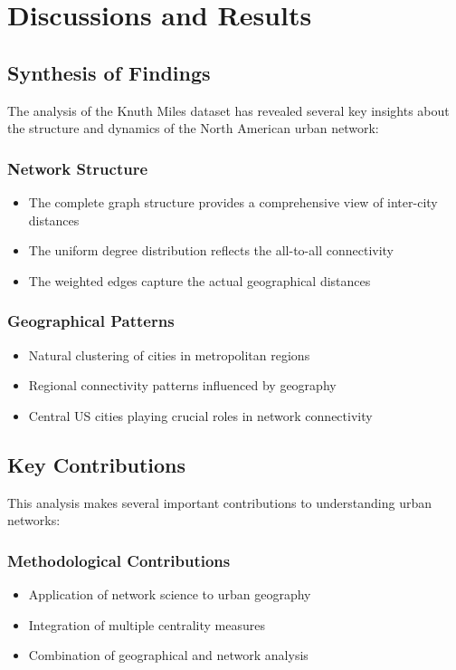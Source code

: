 \chapter{Discussions and Results}

\section{Synthesis of Findings}
The analysis of the Knuth Miles dataset has revealed several key insights about the structure and dynamics of the North American urban network:

\subsection{Network Structure}
\begin{itemize}
    \item The complete graph structure provides a comprehensive view of inter-city distances
    \item The uniform degree distribution reflects the all-to-all connectivity
    \item The weighted edges capture the actual geographical distances
\end{itemize}

\subsection{Geographical Patterns}
\begin{itemize}
    \item Natural clustering of cities in metropolitan regions
    \item Regional connectivity patterns influenced by geography
    \item Central US cities playing crucial roles in network connectivity
\end{itemize}

\section{Key Contributions}
This analysis makes several important contributions to understanding urban networks:

\subsection{Methodological Contributions}
\begin{itemize}
    \item Application of network science to urban geography
    \item Integration of multiple centrality measures
    \item Combination of geographical and network analysis
\end{itemize}

